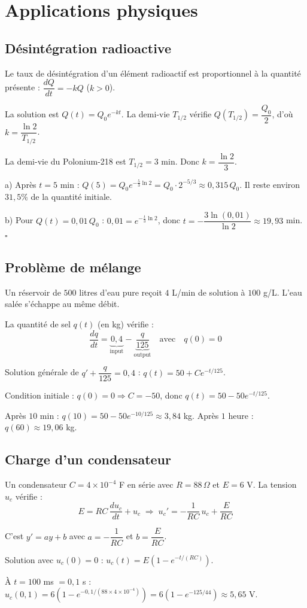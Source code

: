 \section{Applications physiques}

\subsection{D\'esint\'egration radioactive}

Le taux de d\'esint\'egration d'un \'el\'ement radioactif est proportionnel \`a la quantit\'e
pr\'esente : $\dfrac{dQ}{dt}=-kQ$ ($k>0$).

La solution est $Q(t)=Q_0 e^{-kt}$. La demi-vie $T_{1/2}$ v\'erifie $Q(T_{1/2})=\dfrac{Q_0}{2}$,
d'o\`u $k=\dfrac{\ln 2}{T_{1/2}}$.

\Exemple La demi-vie du Polonium-218 est $T_{1/2}=3$ min. Donc $k=\dfrac{\ln 2}{3}$.

a) Apr\`es $t=5$ min : $Q(5)=Q_0 e^{-\frac{5}{3}\ln 2}=Q_0\cdot 2^{-5/3}\approx 0{,}315\,Q_0$.
Il reste environ $31{,}5\%$ de la quantit\'e initiale.

b) Pour $Q(t)=0{,}01\,Q_0$ : $0{,}01=e^{-\frac{t}{3}\ln 2}$, donc
$t=-\dfrac{3\ln(0{,}01)}{\ln 2}\approx 19{,}93$ min. \hfill$\square$

\subsection{Probl\`eme de m\'elange}

Un r\'eservoir de $500$ litres d'eau pure re\c{c}oit $4$ L/min de solution \`a $100$ g/L.
L'eau sal\'ee s'\'echappe au m\^eme d\'ebit.

La quantit\'e de sel $q(t)$ (en kg) v\'erifie :
\[
  \frac{dq}{dt}=\underbrace{0{,}4}_{\text{input}}-\underbrace{\frac{q}{125}}_{\text{output}}
  \quad\text{avec}\quad q(0)=0
\]

Solution g\'en\'erale de $q'+\dfrac{q}{125}=0{,}4$ : $q(t)=50+Ce^{-t/125}$.

Condition initiale : $q(0)=0\Rightarrow C=-50$, donc $q(t)=50-50e^{-t/125}$.

Apr\`es $10$ min : $q(10)=50-50e^{-10/125}\approx 3{,}84$ kg.
Apr\`es $1$ heure : $q(60)\approx 19{,}06$ kg.

\subsection{Charge d'un condensateur}

Un condensateur $C=4\times 10^{-4}$ F en s\'erie avec $R=88\,\Omega$ et $E=6$ V.
La tension $u_c$ v\'erifie :
\[
  E=RC\,\frac{du_c}{dt}+u_c
  \;\Longrightarrow\;
  u_c'=-\frac{1}{RC}\,u_c+\frac{E}{RC}
\]

C'est $y'=ay+b$ avec $a=-\dfrac{1}{RC}$ et $b=\dfrac{E}{RC}$.

Solution avec $u_c(0)=0$ : $u_c(t)=E\!\left(1-e^{-t/(RC)}\right)$.

\`A $t=100$ ms $= 0{,}1$ s :
$u_c(0{,}1)=6\!\left(1-e^{-0{,}1/(88\times 4\times 10^{-4})}\right)=6\!\left(1-e^{-125/44}\right)\approx 5{,}65$ V.
